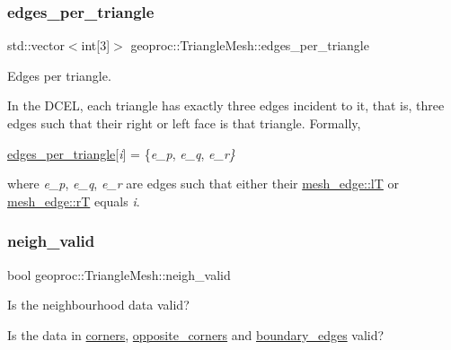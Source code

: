 \subsubsection{\texorpdfstring{edges\+\_\+per\+\_\+triangle}{edges\_per\_triangle}}
{\footnotesize\ttfamily std\+::vector$<$int\mbox{[}3\mbox{]}$>$ geoproc\+::\+Triangle\+Mesh\+::edges\+\_\+per\+\_\+triangle\hspace{0.3cm}{\ttfamily [protected]}}



Edges per triangle. 

In the D\+C\+EL, each triangle has exactly three edges incident to it, that is, three edges such that their right or left face is that triangle. Formally,

\hyperlink{classgeoproc_1_1TriangleMesh_ad72cdd2358e815a09c07176730b4e0a5}{edges\+\_\+per\+\_\+triangle}\mbox{[}{\itshape i}\mbox{]} = \{{\itshape e\+\_\+p}, {\itshape e\+\_\+q}, {\itshape e\+\_\+r\}} 

where {\itshape e\+\_\+p}, {\itshape e\+\_\+q}, {\itshape e\+\_\+r} are edges such that either their \hyperlink{classgeoproc_1_1mesh__edge_a348d06b420ce1588be1bc7eac781c6ef}{mesh\+\_\+edge\+::lT} or \hyperlink{classgeoproc_1_1mesh__edge_af19f02d3f6c36f2b23afa581c8ae3f59}{mesh\+\_\+edge\+::rT} equals {\itshape i}. \mbox{\label{classgeoproc_1_1TriangleMesh_a21205ec88e494f864db4d8247db70d3c}} 
\subsubsection{\texorpdfstring{neigh\+\_\+valid}{neigh\_valid}}
{\footnotesize\ttfamily bool geoproc\+::\+Triangle\+Mesh\+::neigh\+\_\+valid\hspace{0.3cm}{\ttfamily [protected]}}



Is the neighbourhood data valid? 

Is the data in \hyperlink{classgeoproc_1_1TriangleMesh_ab9610d614e081deb28010d237fecd55b}{corners}, \hyperlink{classgeoproc_1_1TriangleMesh_a2604795c90c694116513252b86d242b4}{opposite\+\_\+corners} and \hyperlink{classgeoproc_1_1TriangleMesh_a142a764ddf07b98c7efcd596d88c3f87}{boundary\+\_\+edges} valid? \mbox{\label{classgeoproc_1_1TriangleMesh_ab9030a0301b2fe5868ad6c08692cce09}} 
